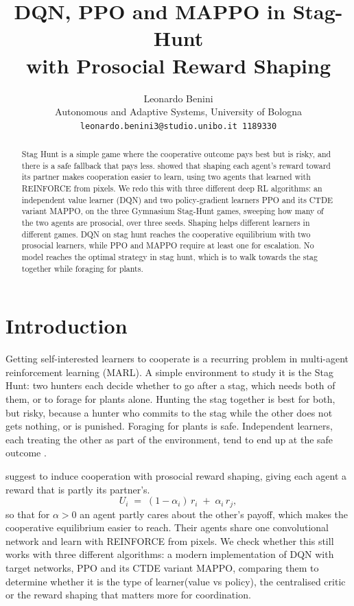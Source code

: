 \documentclass{article}
\title{DQN, PPO and MAPPO in Stag-Hunt 
\\ with Prosocial Reward Shaping}
\author{%
  Leonardo Benini\\
  Autonomous and Adaptive Systems, University of Bologna\\
  \texttt{leonardo.benini3@studio.unibo.it 1189330}
}
\begin{document}
\maketitle

\begin{abstract}
Stag Hunt is a simple game where the cooperative outcome pays best but is risky, and
there is a safe fallback that pays less. \citet{prosoc} showed that shaping each agent's
reward toward its partner makes cooperation easier to
learn, using two agents that learned with REINFORCE from pixels. We
redo this with three different deep RL algorithms: an independent value learner (DQN) and two
policy-gradient learners PPO and its CTDE variant MAPPO, on the three Gymnasium Stag-Hunt games,
sweeping how many of the two agents are prosocial, over three seeds. Shaping helps
different learners in different games. DQN on stag hunt reaches the cooperative equilibrium
with two prosocial learners, while PPO and MAPPO require at least one for escalation.
No model reaches the optimal strategy in stag hunt, which is to walk towards the stag together
while foraging for plants.
\end{abstract}

\section{Introduction}

Getting self-interested learners to cooperate is a recurring problem in multi-agent
reinforcement learning (MARL). A simple environment to study it is the Stag Hunt: two hunters each
decide whether to go after a stag, which needs both of them, or to forage for plants alone.
Hunting the stag together is best for both, but risky, because a hunter who commits to the
stag while the other does not gets nothing, or is punished. Foraging for plants is safe.
Independent learners, each treating the other as part of the environment, tend to end up at
the safe outcome \citep{prosoc}.

\citet{prosoc} suggest to induce cooperation with prosocial reward shaping, 
giving each agent a reward that is partly its partner's.
\begin{equation}
  U_i \;=\; (1-\alpha_i)\, r_i \;+\; \alpha_i\, r_j ,
  \label{eq:prosocial}
\end{equation}
so that for $\alpha>0$ an agent partly cares about the other's payoff, which makes the
cooperative equilibrium easier to reach. Their agents share one convolutional network and
learn with REINFORCE from pixels. We check whether this still works with three different algorithms:
a modern implementation of DQN with target networks, PPO and its CTDE variant MAPPO, comparing them to determine
whether it is the type of learner(value vs policy), the centralised critic or the reward shaping that matters more for coordination.
\end{document}
